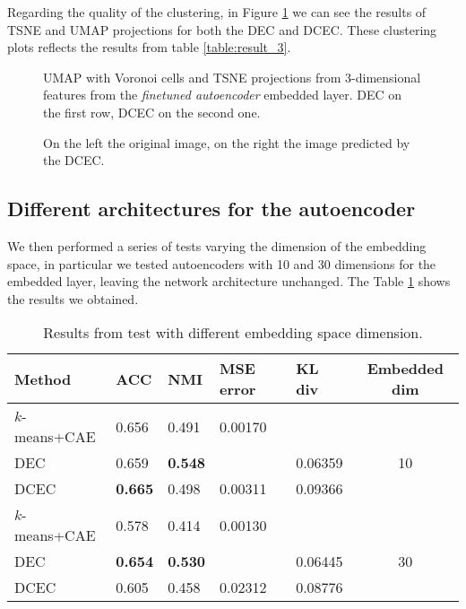 Regarding the quality of the clustering, in Figure \ref{fig:TSNE_UMAP_finetuning_3} we can see the results of TSNE and UMAP projections for both the DEC and DCEC. These clustering plots reflects the results from table \ref{table:result_3}. 

\begin{figure}[H]
    \centering
    
    
    
    
    \caption{UMAP with Voronoi cells and TSNE projections from 3-dimensional features from the \textit{finetuned autoencoder} embedded layer. DEC on the first row, DCEC on the second one.}
    \label{fig:TSNE_UMAP_finetuning_3}
\end{figure}

\begin{figure}[H]
    \centering
    
    
    
    \caption{On the left the original image, on the right the image predicted by the DCEC.}
    \label{fig:pred_DCEC_3}
\end{figure}

\subsection{Different architectures for the autoencoder}

We then performed a series of tests varying the dimension of the embedding space, in particular we tested autoencoders with 10 and 30 dimensions for the embedded layer, leaving the network architecture unchanged. The Table \ref{table_10_30} shows the results we obtained.

\begin{table}[H]
\centering
\begin{tabular}{lllllc} \hline
\textbf{Method} & \textbf{ACC} & \textbf{NMI} & \textbf{MSE error} & \textbf{KL div} & \textbf{Embedded dim} \\ \hline
$k$-means+CAE  & 0.656 & 0.491 & 0.00170 &  & \\ 
DEC  & 0.659  & \textbf{0.548}  &  & 0.06359 & 10  \\ 
DCEC & \textbf{0.665}  & 0.498  & 0.00311 & 0.09366 &   \\ \hline
$k$-means+CAE & 0.578 & 0.414 & 0.00130 &  &  \\ 
DEC  & \textbf{0.654}  &  \textbf{0.530} &  & 0.06445 & 30  \\ 
DCEC & 0.605  &  0.458 & 0.02312 & 0.08776 & \\ \hline 
\end{tabular}
\caption{Results from test with different embedding space dimension.}
\label{table_10_30}
\end{table}

